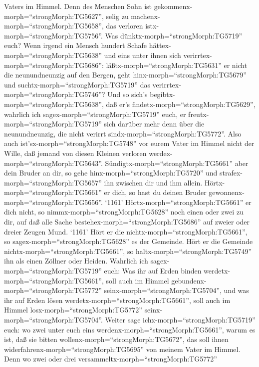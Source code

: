 Vaters im Himmel.  Denn des Menschen Sohn ist
gekommenx-morph=``strongMorph:TG5627'', selig zu
machenx-morph=``strongMorph:TG5658'', das verloren
istx-morph=``strongMorph:TG5756''.  Was
dünktx-morph=``strongMorph:TG5719'' euch? Wenn irgend ein Mensch hundert
Schafe hättex-morph=``strongMorph:TG5638'' und eins unter ihnen sich
verirrtex-morph=``strongMorph:TG5686'':
läßtx-morph=``strongMorph:TG5631'' er nicht die neunundneunzig auf den
Bergen, geht hinx-morph=``strongMorph:TG5679'' und
suchtx-morph=``strongMorph:TG5719'' das
verirrtex-morph=``strongMorph:TG5746''?  Und so sich's
begibtx-morph=``strongMorph:TG5638'', daß er's
findetx-morph=``strongMorph:TG5629'', wahrlich ich
sagex-morph=``strongMorph:TG5719'' euch, er
freutx-morph=``strongMorph:TG5719'' sich darüber mehr denn über die
neunundneunzig, die nicht verirrt sindx-morph=``strongMorph:TG5772''.
 Also auch ist'sx-morph=``strongMorph:TG5748'' vor eurem
Vater im Himmel nicht der Wille, daß jemand von diesen Kleinen verloren
werdex-morph=``strongMorph:TG5643''. 
Sündigtx-morph=``strongMorph:TG5661'' aber dein Bruder an dir, so gehe
hinx-morph=``strongMorph:TG5720'' und
strafex-morph=``strongMorph:TG5657'' ihn zwischen dir und ihm allein.
Hörtx-morph=``strongMorph:TG5661'' er dich, so hast du deinen Bruder
gewonnenx-morph=``strongMorph:TG5656''.  `1161'
Hörtx-morph=``strongMorph:TG5661'' er dich nicht, so
nimmx-morph=``strongMorph:TG5628'' noch einen oder zwei zu dir, auf daß
alle Sache bestehex-morph=``strongMorph:TG5686'' auf zweier oder dreier
Zeugen Mund.  `1161' Hört er die
nichtx-morph=``strongMorph:TG5661'', so
sagex-morph=``strongMorph:TG5628'' es der Gemeinde. Hört er die Gemeinde
nichtx-morph=``strongMorph:TG5661'', so
haltx-morph=``strongMorph:TG5749'' ihn als einen Zöllner oder Heiden.
 Wahrlich ich sagex-morph=``strongMorph:TG5719'' euch: Was
ihr auf Erden binden werdetx-morph=``strongMorph:TG5661'', soll auch im
Himmel gebundenx-morph=``strongMorph:TG5772''
seinx-morph=``strongMorph:TG5704'', und was ihr auf Erden lösen
werdetx-morph=``strongMorph:TG5661'', soll auch im Himmel
losx-morph=``strongMorph:TG5772'' seinx-morph=``strongMorph:TG5704''.
 Weiter sage ichx-morph=``strongMorph:TG5719'' euch: wo
zwei unter euch eins werdenx-morph=``strongMorph:TG5661'', warum es ist,
daß sie bitten wollenx-morph=``strongMorph:TG5672'', das soll ihnen
widerfahrenx-morph=``strongMorph:TG5695'' von meinem Vater im Himmel.
 Denn wo zwei oder drei
versammeltx-morph=``strongMorph:TG5772''
